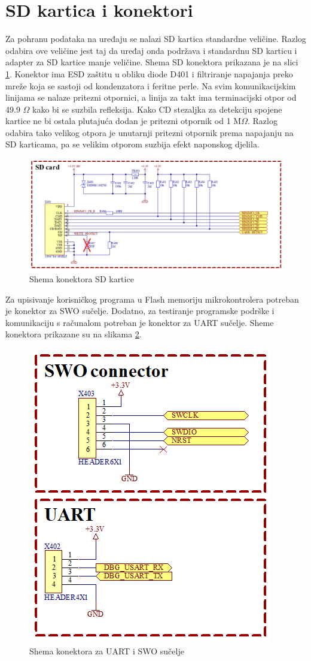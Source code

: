 \section{SD kartica i konektori}
Za pohranu podataka na uređaju se nalazi SD kartica standardne veličine. Razlog odabira ove veličine jest taj da uređaj onda podržava i standardnu SD karticu i adapter za SD kartice manje veličine. Shema SD konektora prikazana je na slici \ref{slk:SD}. Konektor ima ESD zaštitu u obliku diode D401 i filtriranje napajanja preko mreže koja se sastoji od kondenzatora i feritne perle. Na svim komunikacijskim linijama se nalaze pritezni otpornici, a linija za takt ima terminacijski otpor od 49.9 $\Omega$ kako bi se suzbila refleksija. Kako CD stezaljka za detekciju spojene kartice ne bi ostala plutajuća dodan je pritezni otpornik od 1 M$\Omega$. Razlog odabira tako velikog otpora je unutarnji pritezni otpornik prema napajanju na SD karticama, pa se velikim otporom suzbija efekt naponskog djelila.
\begin{figure}[h!bt]
    \centering
    \includegraphics[width=\textwidth]{Figures/SD.png}
    \caption{Shema konektora SD kartice}
    \label{slk:SD}
\end{figure}

Za upisivanje korisničkog programa u Flash memoriju mikrokontrolera potreban je konektor za SWO sučelje. Dodatno, za testiranje programske podrške i komunikaciju s računalom potreban je konektor za UART sučelje. Sheme konektora prikazane su na slikama \ref{slk:UART_SWO}.
\begin{figure}[!hbt]
    \centering
    \includegraphics[width=6 cm]{Figures/SWO_UART.png}
    \caption{Shema konektora za UART i SWO sučelje}
    \label{slk:UART_SWO}
\end{figure}

